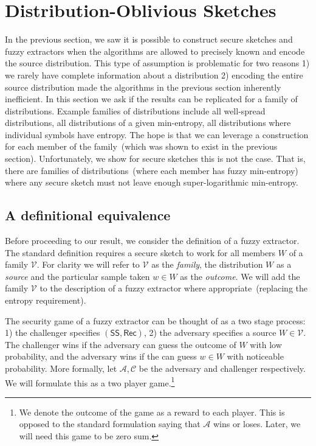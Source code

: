 \documentclass[11pt]{article}
\newcommand{\class}[1]{{\ensuremath{\mathsf{#1}}}}
\newcommand{\sketch}{\ensuremath{\class{SS}}\xspace}
\newcommand{\rec}{\ensuremath{\class{Rec}}\xspace}
\begin{document}
\section{Distribution-Oblivious Sketches}
\label{sec:dist oblivious}

In the previous section, we saw it is possible to construct secure sketches and fuzzy extractors when the algorithms are allowed to precisely known and encode the source distribution.  This type of assumption is problematic for two reasons 1) we rarely have complete information about a distribution 2) encoding the entire source distribution made the algorithms in the previous section inherently inefficient.  In this section we ask if the results can be replicated for a family of distributions.  Example families of distributions include all well-spread distributions, all distributions of a given min-entropy, all distributions where individual symbols have entropy.  The hope is that we can leverage a construction for each member of the family~(which was shown to exist in the previous section).  Unfortunately, we show for secure sketches this is not the case.  That is, there are families of distributions~(where each member has fuzzy min-entropy) where any secure sketch must not leave enough super-logarithmic min-entropy.

\subsection{A definitional equivalence}
Before proceeding to our result, we consider the definition of a fuzzy extractor.  The standard definition requires a secure sketch to work for all members $W$ of a family $\mathcal{V}$.  For clarity we will refer to $\mathcal{V}$ as the \emph{family}, the distribution $W$ as a \emph{source} and the particular sample taken $w\in W$ as the \emph{outcome}.    We will add the family $\mathcal{V}$ to the description of a fuzzy extractor where appropriate~(replacing the entropy requirement).

The security game of a fuzzy extractor can be thought of as a two stage process: 1) the challenger specifies $(\sketch, \rec)$, 2) the adversary specifies a source $W\in \mathcal{V}$.  The challenger wins if the adversary can guess the outcome of $W$ with low probability, and the adversary wins if the can guess $w\in W$ with noticeable probability.  More formally, let $\mathcal{A}, \mathcal{C}$ be the adversary and challenger respectively. We will formulate this as a two player game.\footnote{We denote the outcome of the game as a reward to each player.  This is opposed to the standard formulation saying that $\mathcal{A}$ wins or loses.  Later, we will need this game to be zero sum.}
\end{document}
